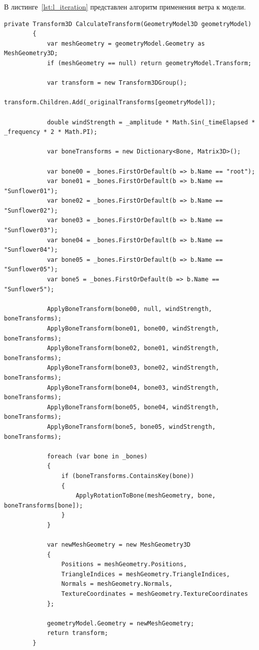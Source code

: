 В листинге~\ref{lst:l_iteration} представлен алгоритм применения ветра к модели.
\begin{center}
\begin{lstlisting}[caption={Алгоритм применения ветра к модели}, label={lst:l_iteration}]
private Transform3D CalculateTransform(GeometryModel3D geometryModel)
        {
            var meshGeometry = geometryModel.Geometry as MeshGeometry3D;
            if (meshGeometry == null) return geometryModel.Transform;

            var transform = new Transform3DGroup();
            transform.Children.Add(_originalTransforms[geometryModel]);

            double windStrength = _amplitude * Math.Sin(_timeElapsed * _frequency * 2 * Math.PI);

            var boneTransforms = new Dictionary<Bone, Matrix3D>();
            
            var bone00 = _bones.FirstOrDefault(b => b.Name == "root");
            var bone01 = _bones.FirstOrDefault(b => b.Name == "Sunflower01");
            var bone02 = _bones.FirstOrDefault(b => b.Name == "Sunflower02");
            var bone03 = _bones.FirstOrDefault(b => b.Name == "Sunflower03");
            var bone04 = _bones.FirstOrDefault(b => b.Name == "Sunflower04");
            var bone05 = _bones.FirstOrDefault(b => b.Name == "Sunflower05");
            var bone5 = _bones.FirstOrDefault(b => b.Name == "Sunflower5");

            ApplyBoneTransform(bone00, null, windStrength, boneTransforms);
            ApplyBoneTransform(bone01, bone00, windStrength, boneTransforms);
            ApplyBoneTransform(bone02, bone01, windStrength, boneTransforms);
            ApplyBoneTransform(bone03, bone02, windStrength, boneTransforms);
            ApplyBoneTransform(bone04, bone03, windStrength, boneTransforms);
            ApplyBoneTransform(bone05, bone04, windStrength, boneTransforms);
            ApplyBoneTransform(bone5, bone05, windStrength, boneTransforms);
            
            foreach (var bone in _bones)
            {
                if (boneTransforms.ContainsKey(bone))
                {
                    ApplyRotationToBone(meshGeometry, bone, boneTransforms[bone]);
                }
            }
            
            var newMeshGeometry = new MeshGeometry3D
            {
                Positions = meshGeometry.Positions,
                TriangleIndices = meshGeometry.TriangleIndices,
                Normals = meshGeometry.Normals,
                TextureCoordinates = meshGeometry.TextureCoordinates
            };

            geometryModel.Geometry = newMeshGeometry;
            return transform;
        }
\end{lstlisting}
\end{center}

